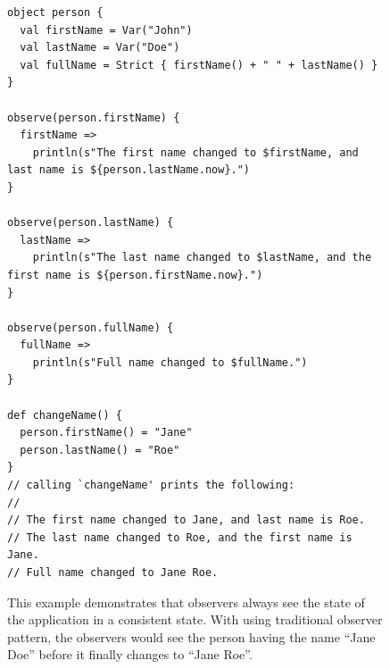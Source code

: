 \begin{figure}[h!] 
\begin{lstlisting}
object person {
  val firstName = Var("John")
  val lastName = Var("Doe")
  val fullName = Strict { firstName() + " " + lastName() }
}

observe(person.firstName) {
  firstName =>
    println(s"The first name changed to $firstName, and last name is ${person.lastName.now}.")
}

observe(person.lastName) {
  lastName =>
    println(s"The last name changed to $lastName, and the first name is ${person.firstName.now}.")
}

observe(person.fullName) {
  fullName =>
    println(s"Full name changed to $fullName.")
}

def changeName() {          
  person.firstName() = "Jane"
  person.lastName() = "Roe"
}
// calling `changeName' prints the following:
//
// The first name changed to Jane, and last name is Roe.
// The last name changed to Roe, and the first name is Jane.
// Full name changed to Jane Roe.
\end{lstlisting}
\caption{This example demonstrates that observers always see the state of the application in a consistent state. With using traditional observer pattern, the observers would see the person having the name ``Jane Doe'' before it finally changes to ``Jane Roe''.}
\label{fig:example_scala-react-consistency}
\end{figure}





